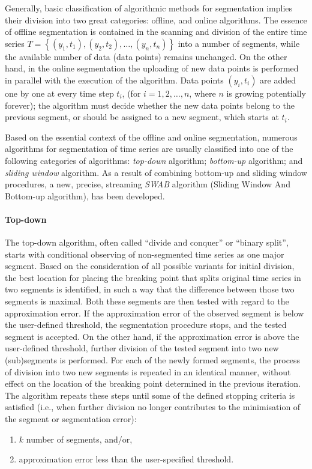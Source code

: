 \documentclass[a4paper]{article}
\begin{document}
Generally, basic classification of algorithmic methods for segmentation implies their division into two great categories: offline, and online algorithms. The essence of offline segmentation is contained in the scanning and division of the entire time series $ T = \left\{ \left( y_1, t_1\right), \left(y_2, t_2 \right), \dots ,\left(y_n, t_n\right)\right\} $ into a number of segments, while the available number of data (data points) remains unchanged. On the other hand, in the online segmentation the uploading of new data points is performed in parallel with the execution of the algorithm. Data points $\left(y_i, t_i\right)$ are added one by one at every time step $t_i$, (for $i = 1,2, \dots ,n$, where $n$ is growing potentially forever); the algorithm must decide whether the new data points belong to the previous segment, or should be assigned to a new segment, which starts at $t_i$. 

Based on the essential context of the offline and online segmentation, numerous algorithms for segmentation of time series are usually classified into one of the following categories of algorithms: \emph{top-down} algorithm; \emph{bottom-up} algorithm; and \emph{sliding window} algorithm. As a result of combining bottom-up and sliding window procedures, a new, precise, streaming \emph{SWAB} algorithm (Sliding Window And Bottom-up algorithm), has been developed.

\paragraph{Top-down} The top-down algorithm, often called \enquote{divide and conquer} or \enquote{binary split}, starts with conditional observing of non-segmented time series as one major segment. Based on the consideration of all possible variants for initial division, the best location for placing the breaking point that splits original time series in two segments is identified, in such a way that the difference between those two segments is maximal. Both these segments are then tested with regard to the approximation error. If the approximation error of the observed segment is below the user-defined threshold, the segmentation procedure stops, and the tested segment is accepted. On the other hand, if the approximation error is above the user-defined threshold, further division of the tested segment into two new (sub)segments is performed. For each of the newly formed segments, the process of division into two new segments is repeated in an identical manner, without effect on the location of the breaking point determined in the previous iteration. The algorithm repeats these steps until some of the defined stopping criteria is satisfied (i.e., when further division no longer contributes to the minimisation of the segment or segmentation error): \begin{enumerate}
	\item $k$ number of segments, and/or,
	\item approximation error less than the user-specified threshold.
\end{enumerate} 
\end{document}
